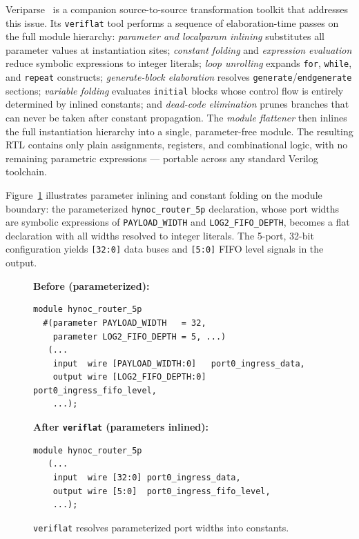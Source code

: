 Veriparse~\cite{veriparse} is a companion source-to-source transformation toolkit
that addresses this issue. Its \texttt{veriflat} tool performs a sequence of
elaboration-time passes on the full module hierarchy: \emph{parameter and
localparam inlining} substitutes all parameter values at instantiation sites;
\emph{constant folding} and \emph{expression evaluation} reduce symbolic
expressions to integer literals; \emph{loop unrolling} expands \texttt{for},
\texttt{while}, and \texttt{repeat} constructs; \emph{generate-block elaboration}
resolves \texttt{generate}/\texttt{endgenerate} sections; \emph{variable folding}
evaluates \texttt{initial} blocks whose control flow is entirely determined by
inlined constants; and \emph{dead-code elimination} prunes branches that can never
be taken after constant propagation. The \emph{module flattener} then inlines the
full instantiation hierarchy into a single, parameter-free module. The resulting
RTL contains only plain assignments, registers, and combinational logic, with no
remaining parametric expressions — portable across any standard Verilog toolchain.

Figure~\ref{fig:veriflat-router} illustrates parameter inlining and constant
folding on the module boundary: the parameterized \texttt{hynoc\_router\_5p}
declaration, whose port widths are symbolic expressions of \texttt{PAYLOAD\_WIDTH}
and \texttt{LOG2\_FIFO\_DEPTH}, becomes a flat declaration with all widths
resolved to integer literals. The 5-port, 32-bit configuration yields
\texttt{[32:0]} data buses and \texttt{[5:0]} FIFO level signals in the output.

\begin{figure}[t]
\textbf{Before (parameterized):}
\begin{lstlisting}
module hynoc_router_5p
  #(parameter PAYLOAD_WIDTH   = 32,
    parameter LOG2_FIFO_DEPTH = 5, ...)
   (...
    input  wire [PAYLOAD_WIDTH:0]   port0_ingress_data,
    output wire [LOG2_FIFO_DEPTH:0] port0_ingress_fifo_level,
    ...);
\end{lstlisting}
\textbf{After \texttt{veriflat} (parameters inlined):}
\begin{lstlisting}
module hynoc_router_5p
   (...
    input  wire [32:0] port0_ingress_data,
    output wire [5:0]  port0_ingress_fifo_level,
    ...);
\end{lstlisting}
\caption{\texttt{veriflat} resolves parameterized port widths into constants.}
\label{fig:veriflat-router}
\end{figure}

